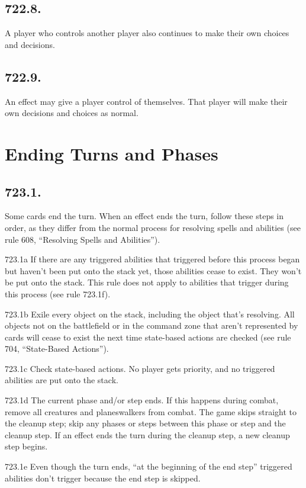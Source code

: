 \subsection*{722.8.}
A player who controls another player also continues to make their own choices and decisions.

\subsection*{722.9.}
An effect may give a player control of themselves. That player will make their own decisions and choices as normal.

\section{Ending Turns and Phases}
\subsection*{723.1.}
Some cards end the turn. When an effect ends the turn, follow these steps in order, as they differ from the normal process for resolving spells and abilities (see rule 608, “Resolving Spells and Abilities”).

723.1a If there are any triggered abilities that triggered before this process began but haven’t been put onto the stack yet, those abilities cease to exist. They won’t be put onto the stack. This rule does not apply to abilities that trigger during this process (see rule 723.1f).

723.1b Exile every object on the stack, including the object that’s resolving. All objects not on the battlefield or in the command zone that aren’t represented by cards will cease to exist the next time state-based actions are checked (see rule 704, “State-Based Actions”).

723.1c Check state-based actions. No player gets priority, and no triggered abilities are put onto the stack.

723.1d The current phase and/or step ends. If this happens during combat, remove all creatures and planeswalkers from combat. The game skips straight to the cleanup step; skip any phases or steps between this phase or step and the cleanup step. If an effect ends the turn during the cleanup step, a new cleanup step begins.

723.1e Even though the turn ends, “at the beginning of the end step” triggered abilities don’t trigger because the end step is skipped.

